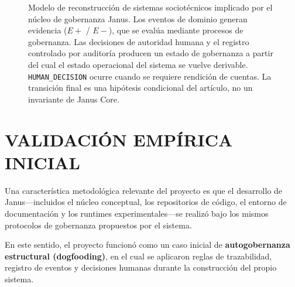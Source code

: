 \documentclass[conference]{IEEEtran}
\begin{document}
\begin{figure}[ht]
\centering
{}
\caption{Modelo de reconstrucción de sistemas sociotécnicos implicado por el núcleo de gobernanza Janus. Los eventos de dominio generan evidencia ($E+$ / $E-$), que se evalúa mediante procesos de gobernanza. Las decisiones de autoridad humana y el registro controlado por auditoría producen un estado de gobernanza a partir del cual el estado operacional del sistema se vuelve derivable. \texttt{HUMAN\_DECISION} ocurre cuando se requiere rendición de cuentas. La transición final es una hipótesis condicional del artículo, no un invariante de Janus Core.}
\label{fig:janus_reconstruction}
\end{figure}

\section{VALIDACIÓN EMPÍRICA INICIAL}
Una característica metodológica relevante del proyecto es que el desarrollo de Janus---incluidos el núcleo conceptual, los repositorios de código, el entorno de documentación y los runtimes experimentales---se realizó bajo los mismos protocolos de gobernanza propuestos por el sistema.

En este sentido, el proyecto funcionó como un caso inicial de \textbf{autogobernanza estructural (dogfooding)}, en el cual se aplicaron reglas de trazabilidad, registro de eventos y decisiones humanas durante la construcción del propio sistema.
\end{document}
